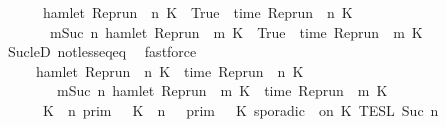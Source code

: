 \begin{isabellebody}
\ \ \ \ {\isacharequal}\ {\isacharbraceleft}{\isasymrho}{\isachardot}\ hamlet\ {\isacharparenleft}{\isacharparenleft}Rep{\isacharunderscore}run\ {\isasymrho}{\isacharparenright}\ n\ K\ {\isacharequal}\ True\ {\isasymand}\ time\ {\isacharparenleft}{\isacharparenleft}Rep{\isacharunderscore}run\ {\isasymrho}{\isacharparenright}\ n\ K\ {\isacharequal}\ {\isasymtau}\isanewline
\ \ \ \ \ \ {\isasymor}\ {\isacharparenleft}{\isasymexists}m{\isasymge}Suc\ n{\isachardot}\ hamlet\ {\isacharparenleft}{\isacharparenleft}Rep{\isacharunderscore}run\ {\isasymrho}{\isacharparenright}\ m\ K\ {\isacharequal}\ True\ {\isasymand}\ time\ {\isacharparenleft}{\isacharparenleft}Rep{\isacharunderscore}run\ {\isasymrho}{\isacharparenright}\ m\ K\ {\isacharequal}\ {\isasymtau}{\isacharparenright}{\isacharbraceright}{\isacartoucheclose}\isanewline
\ \ \ \ \isamarkupfalse%
\ Suc{\isacharunderscore}leD\ not{\isacharunderscore}less{\isacharunderscore}eq{\isacharunderscore}eq\ \isamarkupfalse%
\ fastforce\isanewline
\ \ \isamarkupfalse%
\ \isamarkupfalse%
\isanewline
\ \ \ \ {\isacartoucheopen}{\isacharbraceleft}{\isasymrho}{\isachardot}\ hamlet\ {\isacharparenleft}{\isacharparenleft}Rep{\isacharunderscore}run\ {\isasymrho}{\isacharparenright}\ n\ K\ {\isasymand}\ time\ {\isacharparenleft}{\isacharparenleft}Rep{\isacharunderscore}run\ {\isasymrho}{\isacharparenright}\ n\ K\ {\isacharequal}\ {\isasymtau}\isanewline
\ \ \ \ \ \ \ {\isasymor}\ {\isacharparenleft}{\isasymexists}m{\isasymge}Suc\ n{\isachardot}\ hamlet\ {\isacharparenleft}{\isacharparenleft}Rep{\isacharunderscore}run\ {\isasymrho}{\isacharparenright}\ m\ K\ {\isasymand}\ time\ {\isacharparenleft}{\isacharparenleft}Rep{\isacharunderscore}run\ {\isasymrho}{\isacharparenright}\ m\ K\ {\isacharequal}\ {\isasymtau}{\isacharparenright}{\isacharbraceright}\isanewline
\ \ \ \ {\isacharequal}\ {\isasymlbrakk}\ K\ {\isasymUp}\ n\ {\isasymrbrakk}\isactrlsub p\isactrlsub r\isactrlsub i\isactrlsub m\ {\isasyminter}\ {\isasymlbrakk}\ K\ {\isasymDown}\ n\ {\isacharat}\ {\isasymtau}\ {\isasymrbrakk}\isactrlsub p\isactrlsub r\isactrlsub i\isactrlsub m\ {\isasymunion}\ {\isasymlbrakk}\ K\ sporadic\ {\isasymtau}\ on\ K\ {\isasymrbrakk}\isactrlsub T\isactrlsub E\isactrlsub S\isactrlsub L\isactrlbsup {\isasymge}\ Suc\ n\isactrlesup {\isacartoucheclose}\isanewline

\end{isabellebody}
